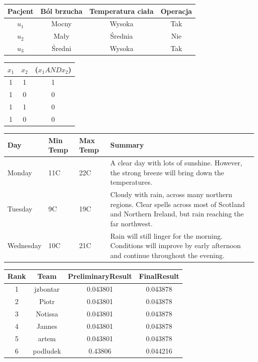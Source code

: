 \documentclass[oneside,openany]{article}
\begin{document}
\begin{center}
\begin{tabular}{c|ccc}
\hline \hline
Pacjent & Ból brzucha & Temperatura ciała & Operacja \\ \hline
$u_1$ & Mocny & Wysoka & Tak \\ 
$u_2$ & Mały & Średnia & Nie \\ 
$u_3$ & Średni & Wysoka & Tak \\ \hline \hline
\end{tabular}
\end{center}

\begin{center}
\begin{tabular}{c|c|c}

\hline \hline
$x_1$ & $x_2$ & ($x_1 AND x_2$) \\ \hline
1 & 1 & 1 \\ 
1 & 0 & 0  \\ 
1 & 1 & 0 \\ 
1 & 0 & 0 \\ \hline \hline
\end{tabular}
\end{center}

\begin{center}
\begin{tabular}{ | l | l | l | p{5cm} |}
\hline
Day & Min Temp & Max Temp & Summary \\ \hline
Monday & 11C & 22C & A clear day with lots of sunshine.
However, the strong breeze will bring down the temperatures. \\ \hline
Tuesday & 9C & 19C & Cloudy with rain, across many northern regions. Clear spells
across most of Scotland and Northern Ireland,
but rain reaching the far northwest. \\ \hline
Wednesday & 10C & 21C & Rain will still linger for the morning.
Conditions will improve by early afternoon and continue
throughout the evening. \\
\hline
\end{tabular}
\end{center}

\begin{center}
\begin{tabular}{cccc}
\hline
Rank & Team & PreliminaryResult & FinalResult \\ \hline
1 & jzbontar & 0.043801 & 0.043878 \\ 
2 & Piotr & 0.043801 & 0.043878 \\ 
3 & Notissa & 0.043801 & 0.043878 \\
4 & Jannes & 0.043801 & 0.043878 \\
5 & artem & 0.043801 & 0.043878 \\
6 & podludek & 0.43806 & 0.044216 \\ \hline
\end{tabular}
\end{center}
\end{document}
